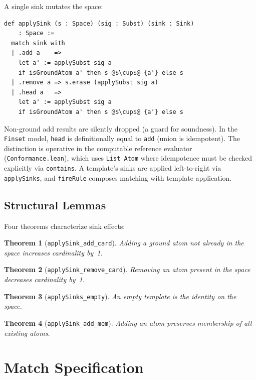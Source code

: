 \documentclass[11pt]{article}
\newtheorem{theorem}{Theorem}[section]
\theoremstyle{definition}
\theoremstyle{remark}
\begin{document}
A single sink mutates the space:

\begin{lstlisting}[caption={Sink application (\texttt{Space.lean}).}]
def applySink (s : Space) (sig : Subst) (sink : Sink)
    : Space :=
  match sink with
  | .add a    =>
    let a' := applySubst sig a
    if isGroundAtom a' then s @$\cup$@ {a'} else s
  | .remove a => s.erase (applySubst sig a)
  | .head a   =>
    let a' := applySubst sig a
    if isGroundAtom a' then s @$\cup$@ {a'} else s
\end{lstlisting}

\noindent
Non-ground add results are silently dropped (a guard for soundness).
In the \texttt{Finset} model, \texttt{head} is definitionally equal to
\texttt{add} (union is idempotent).  The distinction is operative in the
computable reference evaluator (\texttt{Conformance.lean}), which uses
\texttt{List Atom} where idempotence must be checked explicitly via
\texttt{contains}.
A template's sinks are applied left-to-right via \texttt{applySinks},
and \texttt{fireRule} composes matching with template application.

\subsection{Structural Lemmas}

Four theorems characterize sink effects:

\begin{theorem}[\texttt{applySink\_add\_card}]
Adding a ground atom not already in the space increases cardinality by~1.
\end{theorem}

\begin{theorem}[\texttt{applySink\_remove\_card}]
Removing an atom present in the space decreases cardinality by~1.
\end{theorem}

\begin{theorem}[\texttt{applySinks\_empty}]
An empty template is the identity on the space.
\end{theorem}

\begin{theorem}[\texttt{applySink\_add\_mem}]
Adding an atom preserves membership of all existing atoms.
\end{theorem}

\section{Match Specification}
\label{sec:matchspec}
\end{document}
